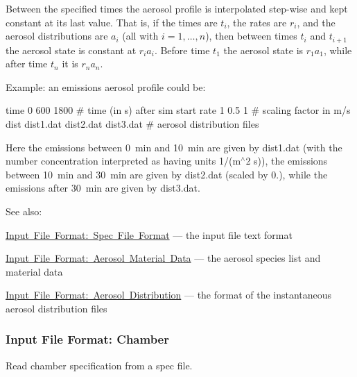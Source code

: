 Between the specified times the aerosol profile is interpolated step-\/wise and kept constant at its last value. That is, if the times are $t_i$, the rates are $r_i$, and the aerosol distributions are $a_i$ (all with $i = 1,\ldots,n$), then between times $t_i$ and $t_{i+1}$ the aerosol state is constant at $r_i a_i$. Before time $t_1$ the aerosol state is $r_1 a_1$, while after time $t_n$ it is $r_n a_n$.

Example\+: an emissions aerosol profile could be\+: 
\begin{DoxyPre}
 time  0          600        1800       \# time (in s) after sim start
 rate  1          0.5        1          \# scaling factor in m/s
 dist  dist1.dat  dist2.dat  dist3.dat  \# aerosol distribution files
 \end{DoxyPre}
 Here the emissions between 0~min and 10~min are given by {\ttfamily dist1.\+dat} (with the number concentration interpreted as having units 1/(m$^\wedge$2 s)), the emissions between 10~min and 30~min are given by {\ttfamily dist2.\+dat} (scaled by 0.), while the emissions after 30~min are given by {\ttfamily dist3.\+dat}.

See also\+:
\begin{DoxyItemize}
\item \mbox{\hyperlink{spec_file_format}{Input File Format\+: Spec File Format}} --- the input file text format
\item \mbox{\hyperlink{input_format_aero_data}{Input File Format\+: Aerosol Material Data}} --- the aerosol species list and material data
\item \mbox{\hyperlink{input_format_aero_dist}{Input File Format\+: Aerosol Distribution}} --- the format of the instantaneous aerosol distribution files 
\end{DoxyItemize}\hypertarget{input_format_chamber}{}\subsubsection{Input File Format\+: Chamber}\label{input_format_chamber}
Read chamber specification from a spec file.


